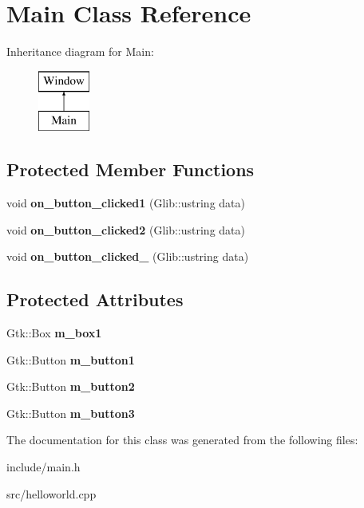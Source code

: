 \hypertarget{class_main}{}\section{Main Class Reference}
\label{class_main}
Inheritance diagram for Main\+:\begin{figure}[H]
\begin{center}
\leavevmode
\includegraphics[height=2.000000cm]{class_main}
\end{center}
\end{figure}
\subsection*{Protected Member Functions}
\begin{DoxyCompactItemize}
\item 
\mbox{\label{class_main_a81d65a9f5456e36279815ebbfcbedd6e}} 
void {\bfseries on\+\_\+button\+\_\+clicked1} (Glib\+::ustring data)
\item 
\mbox{\label{class_main_a57d500a72d8b963d98ab14aaa1fc8339}} 
void {\bfseries on\+\_\+button\+\_\+clicked2} (Glib\+::ustring data)
\item 
\mbox{\label{class_main_a72a1c6090518a2b17d645099c9fadb34}} 
void {\bfseries on\+\_\+button\+\_\+clicked\+\_} (Glib\+::ustring data)
\end{DoxyCompactItemize}
\subsection*{Protected Attributes}
\begin{DoxyCompactItemize}
\item 
\mbox{\label{class_main_a58562d3720f7a909016843288d6e86a9}} 
Gtk\+::\+Box {\bfseries m\+\_\+box1}
\item 
\mbox{\label{class_main_a0896a22071940aa9da5a47607ee018e1}} 
Gtk\+::\+Button {\bfseries m\+\_\+button1}
\item 
\mbox{\label{class_main_a01ba1b5539c3f65a20bb55e4bbdabcf8}} 
Gtk\+::\+Button {\bfseries m\+\_\+button2}
\item 
\mbox{\label{class_main_a0ac42120551fdc4d4ea7d9c74060e11c}} 
Gtk\+::\+Button {\bfseries m\+\_\+button3}
\end{DoxyCompactItemize}


The documentation for this class was generated from the following files\+:\begin{DoxyCompactItemize}
\item 
include/main.\+h\item 
src/helloworld.\+cpp\end{DoxyCompactItemize}
